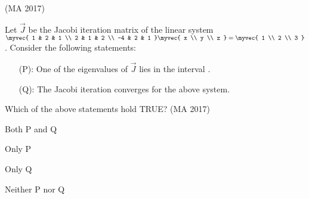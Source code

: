 \hfill (MA 2017)
\item
Let $\vec{J}$ be the Jacobi iteration matrix of the linear system
$\myvec{ 1 & 2 & 1 \\ 2 & 1 & 2 \\ -4 & 2 & 1  } \myvec{ x \\ y \\ z } = \myvec{ 1 \\ 2 \\ 3 }$.
Consider the following statements:
\begin{itemize}
\item[(P):] One of the eigenvalues of $\vec{J}$ lies in the interval .
\item[(Q):] The Jacobi iteration converges for the above system.
\end{itemize}
Which of the above statements hold TRUE?
\hfill (MA 2017)
\begin{enumerate}
\begin{multicols}{4}
\item Both P and Q
\item Only P
\item Only Q
\item Neither P nor Q
\end{multicols}
\end{enumerate}
